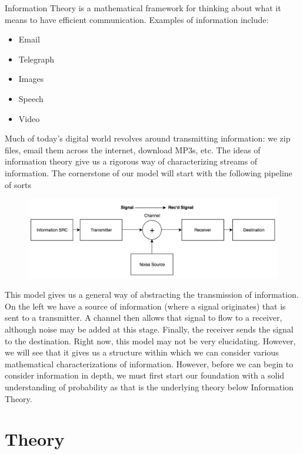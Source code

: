 \documentclass[13pt,oneside]{tufte-book}
\providecommand{\tightlist}{%
  \setlength{\itemsep}{0pt}\setlength{\parskip}{0pt}}
\theoremstyle{definition}
\theoremstyle{definition}
\theoremstyle{definition}
\theoremstyle{remark}
\begin{document}
Information Theory is a mathematical framework for thinking about what
it means to have efficient communication. Examples of information
include:

\begin{itemize}
\tightlist
\item
  Email
\item
  Telegraph
\item
  Images
\item
  Speech
\item
  Video
\end{itemize}

Much of today's digital world revolves around transmitting information:
we zip files, email them across the internet, download MP3s, etc. The
ideas of information theory give us a rigorous way of characterizing
streams of information. The cornerstone of our model will start with the
following pipeline of sorts

\begin{figure}
\centering
\includegraphics{pipeline.png}
\caption{}
\end{figure}

This model gives us a general way of abstracting the transmission of
information. On the left we have a source of information (where a signal
originates) that is sent to a transmitter. A channel then allows that
signal to flow to a receiver, although noise may be added at this stage.
Finally, the receiver sends the signal to the destination. Right now,
this model may not be very elucidating. However, we will see that it
gives us a structure within which we can consider various mathematical
characterizations of information. However, before we can begin to
consider information in depth, we must first start our foundation with a
solid understanding of probability as that is the underlying theory
below Information Theory.

\part{Theory}\label{part-theory}
\end{document}
